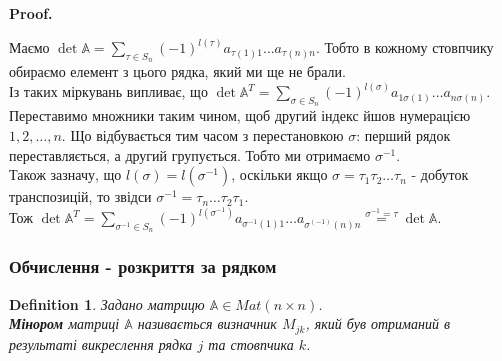 \documentclass[a4paper, 10pt]{article}
\makeatletter
\def\huge{\displaystyle}
\def\qed{$\blacksquare$}
\theoremstyle{theoremdd}
\theoremstyle{theoremdd}
\newtheorem{definition}[theorem]{Definition}
\theoremstyle{theoremdd}
\theoremstyle{theoremdd}
\theoremstyle{theoremdd}
\theoremstyle{theoremdd}
\theoremstyle{theoremdd}
\theoremstyle{theoremdd}
\renewenvironment{proof}[1][Proof.\\]{\par
\pushQED{\hfill \qed}%
\normalfont \topsep6\p@\@plus6\p@\relax
\trivlist
\item\relax
{\bfseries
#1\@addpunct{.}}\hspace\labelsep\ignorespaces
}{%
\popQED\endtrivlist\@endpefalse
}
\makeatother
\begin{document}
\begin{proof}
Маємо $\det \mathbb{A} = \huge\sum_{\tau \in S_n} (-1)^{l(\tau)}a_{\tau(1)1}\dots a_{\tau(n)n}$. Тобто в кожному стовпчику обираємо елемент з цього рядка, який ми ще не брали.\\
Із таких міркувань випливає, що $\det \mathbb{A}^T = \huge\sum_{\sigma \in S_n} (-1)^{l(\sigma)}a_{1 \sigma(1)}\dots a_{n \sigma(n)}$.\\
Переставимо множники таким чином, щоб другий індекс йшов нумерацією $1,2,\dots,n$. Що відбувається тим часом з перестановкою $\sigma$: перший рядок переставляється, а другий групується. Тобто ми отримаємо $\sigma^{-1}$.\\
Також зазначу, що $l(\sigma) = l(\sigma^{-1})$, оскільки якщо $\sigma = \tau_1 \tau_2 \dots \tau_n$ - добуток транспозицій, то звідси $\sigma^{-1} = \tau_n \dots \tau_2 \tau_1$.\\
Тож $\det \mathbb{A}^T = \huge\sum_{\sigma^{-1} \in S_n} (-1)^{l(\sigma^{-1})} a_{\sigma^{-1}(1)1}\dots a_{\sigma^{(-1)}(n)n} \overset{\sigma^{-1} = \tau}{=} \det \mathbb{A}$.
\end{proof}


\subsubsection*{Обчислення - розкриття за рядком}
\begin{definition}
Задано матрицю $\mathbb{A} \in Mat(n \times n)$.\\
\textbf{Мінором} матриці $\mathbb{A}$ називається визначник $M_{jk}$, який був отриманий в результаті викреслення рядка $j$ та стовпчика $k$.
\end{definition}
\end{document}
